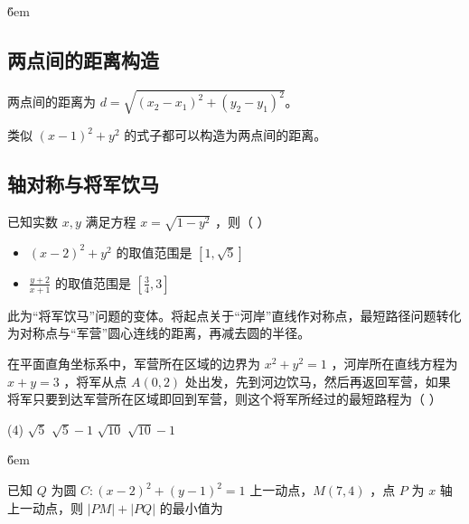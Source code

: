 \v{6em}

\subsection{两点间的距离构造}

\begin{theorem}
    两点间的距离为 $d=\sqrt{(x_2-x_1)^2+(y_2-y_1)^2}$。

    类似 $(x-1)^2+y^2$ 的式子都可以构造为两点间的距离。
\end{theorem}

\subsection{轴对称与将军饮马}

\begin{example}
    已知实数 $x, y$ 满足方程 $x=\sqrt{1-y^2}$ ，则（ \qquad）
    \begin{itemize}
        \item $(x-2)^2+y^2$ 的取值范围是 $[1, \sqrt{5}]$
        \item $\frac{y+2}{x+1}$ 的取值范围是 $\left[\frac{3}{4}, 3\right]$
    \end{itemize}
\end{example}

\begin{theorem}[轴对称与点到圆的距离]
    此为“将军饮马”问题的变体。将起点关于“河岸”直线作对称点，最短路径问题转化为对称点与“军营”圆心连线的距离，再减去圆的半径。
\end{theorem}
\begin{example}
    在平面直角坐标系中，军营所在区域的边界为 $x^2+y^2=1$ ，河岸所在直线方程为 $x+y=3$ ，将军从点 $A(0,2)$ 处出发，先到河边饮马，然后再返回军营，如果将军只要到达军营所在区域即回到军营，则这个将军所经过的最短路程为（ \hspace{2em} ）
    \begin{tasks}(4)
        \task $\sqrt{5}$
        \task $\sqrt{5}-1$
        \task $\sqrt{10}$
        \task $\sqrt{10}-1$
    \end{tasks}
\end{example}

\v{6em}

\begin{example}
    已知 $Q$ 为圆 $C:(x-2)^2+(y-1)^2=1$ 上一动点，$M(7,4)$ ，点 $P$ 为 $x$ 轴上一动点，则 $|P M|+|P Q|$ 的最小值为 $\qquad$
\end{example}

\vspace{6em}

